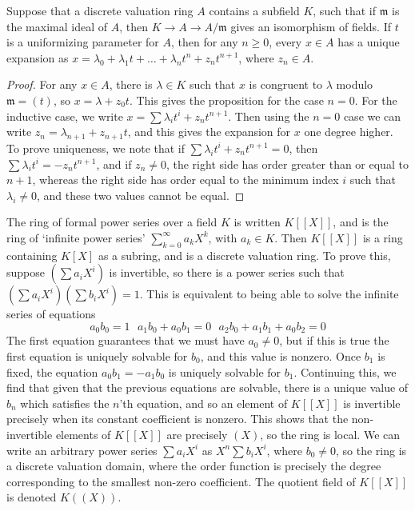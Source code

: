 \begin{prop}
    Suppose that a discrete valuation ring $A$ contains a subfield $K$, such that if $\mathfrak{m}$ is the maximal ideal of $A$, then $K \to A \to A/\mathfrak{m}$ gives an isomorphism of fields. If $t$ is a uniformizing parameter for $A$, then for any $n \geq 0$, every $x \in A$ has a unique expansion as $x = \lambda_0 + \lambda_1 t + \dots + \lambda_n t^n + z_nt^{n+1}$, where $z_n \in A$.
\end{prop}
\begin{proof}
    For any $x \in A$, there is $\lambda \in K$ such that $x$ is congruent to $\lambda$ modulo $\mathfrak{m} = (t)$, so $x = \lambda + z_0t$. This gives the proposition for the case $n = 0$. For the inductive case, we write $x = \sum \lambda_i t^i + z_n t^{n+1}$. Then using the $n = 0$ case we can write $z_n = \lambda_{n+1} + z_{n+1}t$, and this gives the expansion for $x$ one degree higher. To prove uniqueness, we note that if $\sum \lambda_i t^i + z_n t^{n+1} = 0$, then $\sum \lambda_i t^i = -z_n t^{n+1}$, and if $z_n \neq 0$, the right side has order greater than or equal to $n+1$, whereas the right side has order equal to the minimum index $i$ such that $\lambda_i \neq 0$, and these two values cannot be equal.
\end{proof}

The ring of formal power series over a field $K$ is written $K[[X]]$, and is the ring of `infinite power series' $\sum_{k = 0}^\infty a_k X^k$, with $a_k \in K$. Then $K[[X]]$ is a ring containing $K[X]$ as a subring, and is a discrete valuation ring. To prove this, suppose $\left( \sum a_i X^i \right)$ is invertible, so there is a power series such that $\left( \sum a_i X^i \right) \left( \sum b_i X^i \right) = 1$. This is equivalent to being able to solve the infinite series of equations
%
\[ a_0b_0 = 1\ \ \ a_1b_0 + a_0b_1 = 0\ \ \ a_2b_0 + a_1b_1 + a_0b_2 = 0 \]
%
The first equation guarantees that we must have $a_0 \neq 0$, but if this is true the first equation is uniquely solvable for $b_0$, and this value is nonzero. Once $b_1$ is fixed, the equation $a_0b_1 = -a_1b_0$ is uniquely solvable for $b_1$. Continuing this, we find that given that the previous equations are solvable, there is a unique value of $b_n$ which satisfies the $n$'th equation, and so an element of $K[[X]]$ is invertible precisely when its constant coefficient is nonzero. This shows that the non-invertible elements of $K[[X]]$ are precisely $(X)$, so the ring is local. We can write an arbitrary power series $\sum a_i X^i$ as $X^n \sum b_i X^i$, where $b_0 \neq 0$, so the ring is a discrete valuation domain, where the order function is precisely the degree corresponding to the smallest non-zero coefficient. The quotient field of $K[[X]]$ is denoted $K((X))$.

